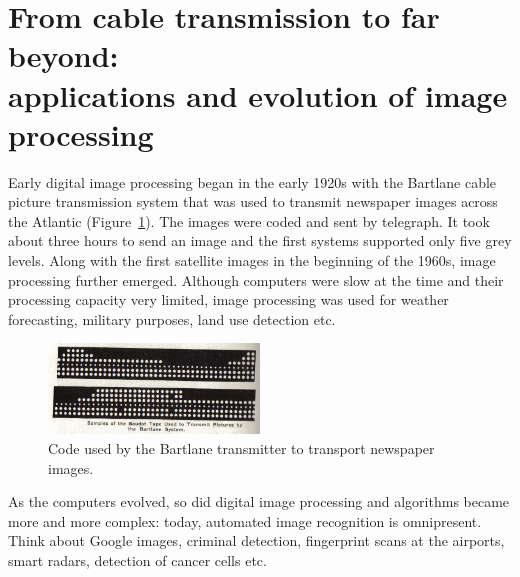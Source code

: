 
\newcommand{\xvect}{\mathbf{x}} 
%
\section{From cable transmission to far beyond: \\ applications and evolution of image processing \label{sec:evolution}}
Early digital image processing began in the early 1920s with the Bartlane cable picture transmission system that was used to transmit newspaper images across the Atlantic (Figure~\ref{fig:bartlane}). The images were coded and sent by telegraph. It took about three hours to send an image and the first systems supported only five grey levels. Along with the first satellite images in the beginning of the 1960s, image processing further emerged. Although computers were slow at the time and their processing capacity very limited, image processing was used for weather forecasting, military purposes, land use detection etc. 

\begin{figure}[h]
	\centering
	\includegraphics[width=0.5\textwidth]{../figures/Bartlane}
	\caption{Code used by the Bartlane transmitter to transport newspaper images.
		\label{fig:bartlane}}
\end{figure}

As the computers evolved, so did digital image processing and algorithms became more and more complex: today, automated image recognition is omnipresent. Think about Google images, criminal detection, fingerprint scans at the airports, smart radars, detection of cancer cells etc. 


